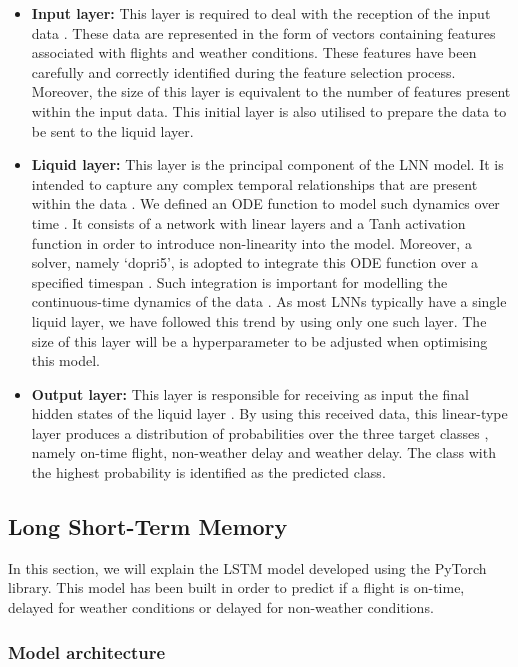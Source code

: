 \documentclass[12pt,oneside]{book} %
\begin{document}
\begin{itemize}
    \item \textbf{Input layer:} This layer is required to deal with the reception of the input data \cite{NN_structure}. These data are represented in the form of vectors containing features associated with flights and weather conditions. These features have been carefully and correctly identified during the feature selection process. Moreover, the size of this layer is equivalent to the number of features present within the input data. This initial layer is also utilised to prepare the data to be sent to the liquid layer.
    \item \textbf{Liquid layer:} This layer is the principal component of the LNN model. It is intended to capture any complex temporal relationships that are present within the data \cite{NN_structure}. We defined an ODE function to model such dynamics over time \citep{ODE1,ODE2}. It consists of a network with linear layers and a Tanh activation function in order to introduce non-linearity into the model. Moreover, a solver, namely ‘dopri5’, is adopted to integrate this ODE function over a specified timespan \cite{solver}. Such integration is important for modelling the continuous-time dynamics of the data \citep{ODE1,ODE2}. As most LNNs typically have a single liquid layer, we have followed this trend by using only one such layer\cite{Liquidlayer}. The size of this layer will be a hyperparameter to be adjusted when optimising this model.
    \item \textbf{Output layer:} This layer is responsible for receiving as input the final hidden states of the liquid layer \cite{NN_structure}. By using this received data, this linear-type layer produces a distribution of probabilities over the three target classes \cite{NN_structure}, namely on-time flight, non-weather delay and weather delay. The class with the highest probability is identified as the predicted class.
\end{itemize}

\subsection{Long Short-Term Memory}

\noindent In this section, we will explain the LSTM model developed using the PyTorch library. This model has been built in order to predict if a flight is on-time, delayed for weather conditions or delayed for non-weather conditions.

\subsubsection{Model architecture}
\end{document}
